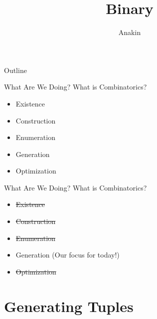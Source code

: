 \documentclass[aspectratio=169]{beamer}
\title{Binary}
\subtitle{\cite[Chapter~7.2.1.1]{TAOCP4A}}
\author{Anakin}
\date{}
\begin{document}

\begin{frame}
\titlepage
\end{frame}

\begin{frame}{Outline}
  \tableofcontents
\end{frame}

\begin{frame}{What Are We Doing?}
    What is Combinatorics? \pause
    \begin{itemize}
        \item Existence
        \item Construction
        \item Enumeration
        \item Generation
        \item Optimization
    \end{itemize}
\end{frame}

\begin{frame}{What Are We Doing?}
    What is Combinatorics?
    \begin{itemize}
        \item \st{Existence}
        \item \st{Construction}
        \item \st{Enumeration}
        \item \textcolor{sigma@mainblue}{Generation} \textcolor{sigma@alertred}{(Our focus for today!)}
        \item \st{Optimization}
    \end{itemize}
\end{frame}


\section{Generating Tuples}
\frame{\sectionpage}
\end{document}

